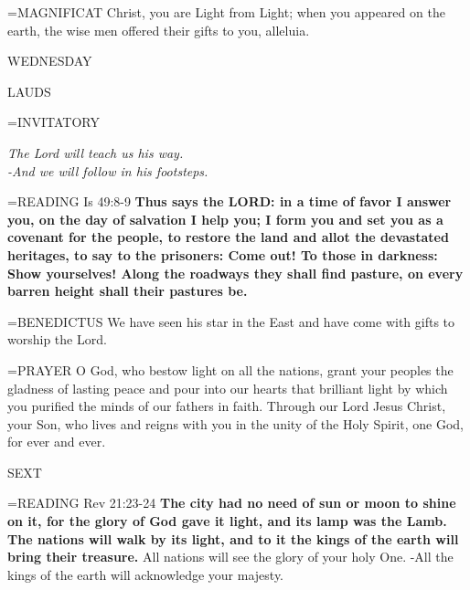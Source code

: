 \hangindent=\parindent \small{MAGNIFICAT 	Christ, you are Light from Light; when you appeared on the earth, the wise men offered their gifts to you, alleluia.\\}

\begin{center}
\normalsize WEDNESDAY
\end{center}

\begin{flushleft}\normalsize LAUDS\\\end{flushleft}
\hangindent=\parindent \small{INVITATORY}
\begin{center}
\textit{The Lord will teach us his way.\\}
\textit{-And we will follow in his footsteps.\\}
\end{center}

\hangindent=\parindent \small{READING}   Is 49:8-9 \textbf{  Thus says the LORD: in a time of favor I answer you, on the day of salvation I help you; I form you and set you as a covenant for the people, to restore the land and allot the devastated heritages, to say to the prisoners: Come out! To those in darkness: Show yourselves! Along the roadways they shall find pasture, on every barren height shall their pastures be.\\}

\hangindent=\parindent \small{BENEDICTUS 	We have seen his star in the East and have come with gifts to worship the Lord.\\}

\hangindent=\parindent \small{PRAYER 	O God, who bestow light on all the nations, grant your peoples the gladness of lasting peace and pour into our hearts that brilliant light by which you purified the minds of our fathers in faith. Through our Lord Jesus Christ, your Son, who lives and reigns with you in the unity of the Holy Spirit, one God, for ever and ever.}

\begin{flushleft}\normalsize SEXT\\\end{flushleft}
\hangindent=\parindent \small{READING}   Rev 21:23-24 \textbf{  The city had no need of sun or moon to shine on it, for the glory of God gave it light, and its lamp was the Lamb. The nations will walk by its light, and to it the kings of the earth will bring their treasure.}
All nations will see the glory of your holy One.
-All the kings of the earth will acknowledge your majesty.

